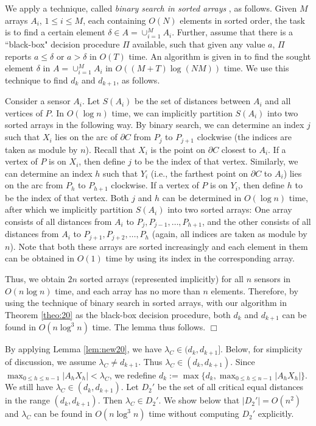 \documentclass[11pt]{article}
\newenvironment{proof}{\noindent {\textbf{Proof:}}\rm}{\hfill $\Box$
\rm}
\begin{document}
\begin{proof}
We apply a technique, called {\em binary search in sorted arrays}
\cite{ref:ChenRe11},
as follows. Given $M$ arrays $A_i$, $1\leq i\leq M$, each containing
$O(N)$ elements in sorted order, the task is to find a certain element $\delta \in
A=\cup_{i=1}^M A_i$. Further, assume that there is a ``black-box"
decision procedure $\Pi$ available, such that given any value $a$,
$\Pi$ reports $a\leq \delta$ or $a>\delta$ in $O(T)$ time. An
algorithm is given in \cite{ref:ChenRe11} to find the sought element
$\delta$ in $A=\cup_{i=1}^MA_i$ in $O((M+T)\log (NM))$
time. We use this technique to find $d_k$ and $d_{k+1}$, as follows.

Consider a sensor $A_i$. Let $S(A_i)$ be the set of distances
between $A_i$ and all vertices of $P$. In $O(\log n)$ time, we can
implicitly partition $S(A_i)$ into two sorted arrays in the
following way. By binary search, we can determine an index $j$ such
that $X_i$ lies on the arc of $\partial C$ from $P_j$ to $P_{j+1}$
clockwise (the indices are taken as module by $n$). Recall that
$X_i$ is the point on $\partial C$ closest to $A_i$. If a vertex of
$P$ is on $X_i$, then define $j$ to be the index of that vertex.
Similarly, we can determine an index $h$ such that $Y_i$ (i.e., the
farthest point on $\partial C$ to $A_i$) lies on the arc from $P_h$
to $P_{h+1}$ clockwise. If a vertex of $P$ is on $Y_i$, then define
$h$ to be the index of that vertex. Both $j$ and $h$ can be
determined in $O(\log n)$ time, after which we implicitly
partition $S(A_i)$ into two sorted arrays: One array consists of all
distances from $A_i$ to $P_j,P_{j-1},\ldots,P_{h+1}$, and the other
consists of all distances from $A_i$ to
$P_{j+1},P_{j+2},\ldots,P_{h}$ (again, all indices are taken as
module by $n$). Note that both these arrays are sorted increasingly and
each element in them can be obtained in $O(1)$ time by using its index in
the corresponding array.

Thus, we obtain $2n$ sorted arrays (represented implicitly) for all $n$ sensors in
$O(n\log n)$ time, and each array has no more than $n$ elements.
Therefore, by using the technique of binary search in sorted arrays, with
our algorithm in Theorem \ref{theo:20} as the black-box decision
procedure, both $d_k$ and $d_{k+1}$ can be found in $O(n\log^3 n)$
time. The lemma thus follows.
\end{proof}

By applying Lemma \ref{lem:new20}, we have $\lambda_C\in (d_k,d_{k+1}]$.
Below, for simplicity of discussion, we assume $\lambda_C\neq d_{k+1}$.
Thus $\lambda_C\in(d_k,d_{k+1})$. Since
$\max_{0\leq h\leq n-1}|A_hX_h|< \lambda_C$,
we redefine $d_k:=\max\{d_k,\max_{0\leq h\leq n-1}|A_hX_h|\}$.
We still have $\lambda_C\in(d_k,d_{k+1})$.
Let $D_2'$ be the set of all
critical equal distances in the range $(d_k,d_{k+1})$. Then $\lambda_C\in D_2'$. We
show below that $|D_2'|=O(n^2)$ and $\lambda_C$ can be found in
$O(n\log^3 n)$ time without computing $D_2'$ explicitly.
\end{document}
